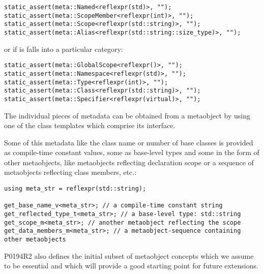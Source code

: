 \begin{verbatim}
static_assert(meta::Named<reflexpr(std)>, "");
static_assert(meta::ScopeMember<reflexpr(int)>, "");
static_assert(meta::Scope<reflexpr(std::string)>, "");
static_assert(meta::Alias<reflexpr(std::string::size_type)>, "");
\end{verbatim}

or if is falls into a particular category:

\begin{verbatim}
static_assert(meta::GlobalScope<reflexpr()>, "");
static_assert(meta::Namespace<reflexpr(std)>, "");
static_assert(meta::Type<reflexpr(int)>, "");
static_assert(meta::Class<reflexpr(std::string)>, "");
static_assert(meta::Specifier<reflexpr(virtual)>, "");
\end{verbatim}

The individual pieces of metadata can be obtained from a metaobject by using one
of the class templates which comprise its interface.

Some of this metadata like the class name or number of base classes is provided
as compile-time constant values, some as base-level types
and some in the form of other metaobjects, like metaobjects
reflecting declaration scope or a sequence of metaobjects reflecting class members,
etc.:

\begin{verbatim}
using meta_str = reflexpr(std::string);

get_base_name_v<meta_str>; // a compile-time constant string
get_reflected_type_t<meta_str>; // a base-level type: std::string
get_scope_m<meta_str>; // another metaobject reflecting the scope
get_data_members_m<meta_str>; // a metaobject-sequence containing other metaobjects
\end{verbatim}

P0194R2 also defines the initial subset
of metaobject concepts which we assume to be essential
and which will provide a good starting point for future extensions.

